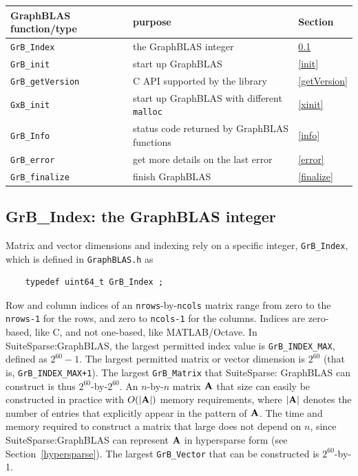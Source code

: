 \vspace{0.2in}
{\footnotesize
\begin{tabular}{lll}
\hline
GraphBLAS function/type   & purpose                                 & Section \\
\hline
\verb'GrB_Index'     & the GraphBLAS integer                        & \ref{grbindex} \\
\verb'GrB_init'      & start up GraphBLAS                           & \ref{init} \\
\verb'GrB_getVersion'& C API supported by the library               & \ref{getVersion} \\
\verb'GxB_init'      & start up GraphBLAS with different \verb'malloc' & \ref{xinit} \\
\verb'GrB_Info'      & status code returned by GraphBLAS functions  & \ref{info} \\
\verb'GrB_error'     & get more details on the last error           & \ref{error} \\
\verb'GrB_finalize'  & finish GraphBLAS                             & \ref{finalize} \\
\hline
\end{tabular}
}
\vspace{0.2in}

\subsection{{\sf GrB\_Index:} the GraphBLAS integer} %
\label{grbindex}

Matrix and vector dimensions and indexing rely on a specific integer,
\verb'GrB_Index', which is defined in \verb'GraphBLAS.h' as

    {\footnotesize
    \begin{verbatim}
    typedef uint64_t GrB_Index ; \end{verbatim}}

Row and column indices of an \verb'nrows'-by-\verb'ncols' matrix range from
zero to the \verb'nrows-1' for the rows, and zero to \verb'ncols-1' for the
columns.  Indices are zero-based, like C, and not one-based, like
MATLAB/Octave.  In SuiteSparse:GraphBLAS, the largest permitted index value
is \verb'GrB_INDEX_MAX', defined as $2^{60}-1$.  The largest permitted
matrix or vector dimension is $2^{60}$ (that is, \verb'GrB_INDEX_MAX+1').
The largest \verb'GrB_Matrix' that
SuiteSparse: GraphBLAS can construct is thus $2^{60}$-by-$2^{60}$.  An
$n$-by-$n$ matrix $\bf A$ that size can easily be constructed in practice with
$O(|{\bf A}|)$ memory requirements, where $|{\bf A}|$ denotes the number of
entries that explicitly appear in the pattern of ${\bf A}$.  The time and
memory required to construct a matrix that large does not depend on $n$, since
SuiteSparse:GraphBLAS can represent ${\bf A}$ in hypersparse form (see
Section~\ref{hypersparse}).  The largest \verb'GrB_Vector' that can be
constructed is $2^{60}$-by-1.

